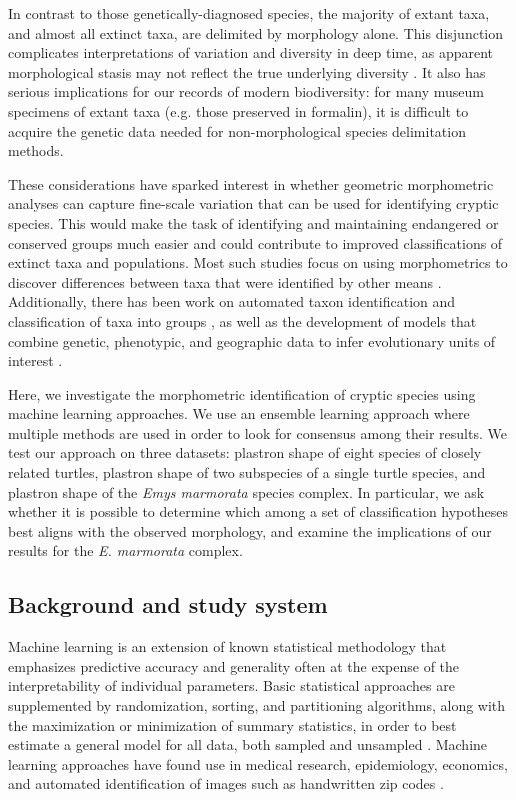 \documentclass[11pt]{article}
\begin{document}
In contrast to those genetically-diagnosed species, the majority of extant taxa, and almost all extinct taxa, are delimited by morphology alone. This disjunction complicates interpretations of variation and diversity in deep time, as apparent morphological stasis may not reflect the true underlying diversity \citep{Eldredge1972,Gould1977a,VanBocxlaer2013}. It also has serious implications for our records of modern biodiversity: for many museum specimens of extant taxa (e.g. those preserved in formalin), it is difficult to acquire the genetic data needed for non-morphological species delimitation methods.

These considerations have sparked interest in whether geometric morphometric analyses can capture fine-scale variation that can be used for identifying cryptic species. This would make the task of identifying and maintaining endangered or conserved groups much easier and could contribute to improved classifications of extinct taxa and populations. Most such studies focus on using morphometrics to discover differences between taxa that were identified by other means \citep{Polly2003,Zelditch2004,Gaubert2005b,Gunduz2007,Polly2007a,Demandt2009,Markolf2013,Fruciano2016}. Additionally, there has been work on automated taxon identification and classification of taxa into groups \citep{Baylac2003,Dobigny2003,MacLeod2007,VandenBrink2011,Vitek2017}, as well as the development of models that combine genetic, phenotypic, and geographic data to infer evolutionary units of interest \citep{Guillot2012}.

Here, we investigate the morphometric identification of cryptic species using machine learning approaches. We use an ensemble learning approach where multiple methods are used in order to look for consensus among their results. We test our approach on three datasets: plastron shape of eight species of closely related turtles, plastron shape of two subspecies of a single turtle species, and plastron shape of the \textit{Emys marmorata} species complex. In particular, we ask whether it is possible to determine which among a set of classification hypotheses best aligns with the observed morphology, and examine the implications of our results for the \textit{E. marmorata} complex. 

\subsection*{Background and study system}
Machine learning is an extension of known statistical methodology \citep{Hastie2009} that emphasizes predictive accuracy and generality often at the expense of the interpretability of individual parameters. Basic statistical approaches are supplemented by randomization, sorting, and partitioning algorithms, along with the maximization or minimization of summary statistics, in order to best estimate a general model for all data, both sampled and unsampled \citep{Hastie2009}. Machine learning approaches have found use in medical research, epidemiology, economics, and automated identification of images such as handwritten zip codes \citep{Hastie2009}. %
\end{document}
